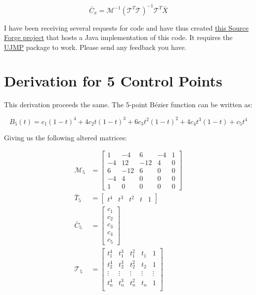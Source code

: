 \documentclass{article}
\begin{document}
\[\bar{C}_x = \mathcal{M}^{-1}(\mathcal{T}^T\mathcal{T})^{-1}\mathcal{T}^T\bar{X}\]

I have been receiving several requests for code and have thus created \href{http://sourceforge.net/projects/lsbezier/}{this Source Forge project} that hosts a Java implementation of this code.  It requires the \href{http://sourceforge.net/projects/ujmp/}{UJMP} package to work. Please send any feedback you have.

\section{Derivation for 5 Control Points}

This derivation proceeds the same.  The 5-point B\'ezier function can be written as:

\[B_5(t) = c_1(1-t)^4 + 4c_2t(1-t)^3 + 6c_3t^2(1-t)^2 + 4c_4t^3(1-t) + c_5t^4\]

Giving us the following altered matrices:

\begin{align*}
  \mathcal{M}_5 &= \left[
    \begin{array}{rrrrr}
       1 & - 4 &   6 & -4 & 1 \\
      -4 &  12 & -12 &  4 & 0 \\
       6 & -12 &   6 &  0 & 0 \\
      -4 &   4 &   0 &  0 & 0 \\
       1 &   0 &   0 &  0 & 0
    \end{array}
  \right] \\
  \bar{T}_5 &= \left[\begin{array}{ccccc}t^4 & t^3 & t^2 & t & 1\end{array}\right] \\
  \bar{C}_5 &= \left[\begin{array}{r}c_1\\c_2\\c_3\\c_4\\c_5\end{array}\right] \\
  \mathcal{T}_5 &= \left[
    \begin{array}{ccccc}
       t_1^4 &  t_1^3 &  t_1^2 &  t_1   &      1 \\
       t_2^4 &  t_2^3 &  t_2^2 &  t_2   &      1 \\
      \vdots & \vdots & \vdots & \vdots & \vdots \\
       t_n^4 &  t_n^3 &  t_n^2 &  t_n   &      1 \\
    \end{array}
  \right]
\end{align*}
\end{document}
